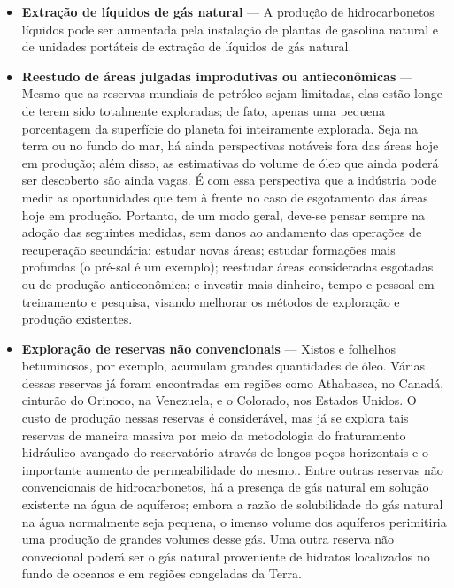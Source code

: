 \begin{itemize}
\item \textbf{Extra\c{c}\~{a}o de l\'{i}quidos de g\'{a}s natural} --- A produ\c{c}\~{a}o de hidrocarbonetos l\'{i}quidos pode ser aumentada pela instala\c{c}\~{a}o de plantas de gasolina natural e de unidades port\'{a}teis de extra\c{c}\~{a}o de l\'{i}quidos de g\'{a}s natural.
\item \textbf{Reestudo de \'{a}reas julgadas improdutivas ou antiecon\^{o}micas} --- Mesmo que as reservas mundiais de petr\'{o}leo sejam limitadas, elas est\~{a}o longe de terem sido totalmente exploradas; de fato, apenas uma pequena porcentagem da superf\'{i}cie do planeta foi inteiramente explorada. Seja na terra ou no fundo do mar, h\'{a} ainda perspectivas not\'{a}veis fora das \'{a}reas hoje em produ\c{c}\~{a}o; al\'{e}m disso, as estimativas do volume de \'{o}leo que ainda poder\'{a} ser descoberto s\~{a}o ainda vagas. \'{E} com essa perspectiva que a ind\'{u}stria pode medir as oportunidades que tem \`{a} frente no caso de esgotamento das \'{a}reas hoje em produ\c{c}\~{a}o. Portanto, de um modo geral, deve-se pensar sempre na ado\c{c}\~{a}o das seguintes medidas, sem danos ao andamento das opera\c{c}\~{o}es de recupera\c{c}\~{a}o secund\'{a}ria: estudar novas \'{a}reas; estudar forma\c{c}\~{o}es mais profundas (o pr\'{e}-sal \'{e} um exemplo); reestudar \'{a}reas consideradas esgotadas ou de produ\c{c}\~{a}o antiecon\^{o}mica; e investir mais dinheiro, tempo e pessoal em treinamento e pesquisa, visando melhorar os m\'{e}todos de explora\c{c}\~{a}o e produ\c{c}\~{a}o existentes.
\item \textbf{Explora\c{c}\~{a}o de reservas n\~{a}o convencionais} --- Xistos e folhelhos betuminosos, por exemplo, acumulam grandes quantidades de \'{o}leo. V\'{a}rias dessas reservas j\'{a} foram encontradas em regi\~{o}es como Athabasca, no Canad\'{a}, cintur\~{a}o do Orinoco, na Venezuela, e o Colorado, nos Estados Unidos. O custo de produ\c{c}\~{a}o nessas reservas \'{e} consider\'{a}vel, mas j\'{a} se explora tais reservas de maneira massiva por meio da metodologia do fraturamento hidr\'{a}ulico avan\c{c}ado do reservatório atrav\'{e}s de longos po\c{c}os horizontais e o importante aumento de permeabilidade do mesmo.. Entre outras reservas n\~{a}o convencionais de hidrocarbonetos, h\'{a} a presen\c{c}a de g\'{a}s natural em solu\c{c}\~{a}o existente na \'{a}gua de aqu\'{i}feros; embora a raz\~{a}o de solubilidade do g\'{a}s natural na \'{a}gua normalmente seja pequena, o imenso volume dos aqu\'{i}feros perimitiria uma produ\c{c}\~{a}o de grandes volumes desse g\'{a}s. Uma outra reserva n\~{a}o convecional poder\'{a} ser o g\'{a}s natural proveniente de hidratos localizados no fundo de oceanos e em regi\~{o}es congeladas da Terra.
\end{itemize}

